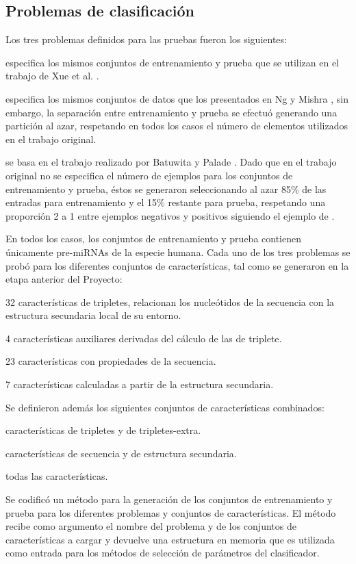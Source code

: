 \documentclass[12pt,bibliography=oldstyle,DIV=12,parskip=half-]{scrreprt}
\begin{document}
\subsection{Problemas de clasificación}
%
Los tres problemas definidos para las pruebas fueron los siguientes:
\begin{description}
  [style=sameline,leftmargin=9em,itemsep=6pt,align=right]
\item[xue]
  especifica los mismos conjuntos de entrenamiento y prueba
  que se utilizan en el trabajo de Xue et al. \cite{xue}.
\item[ng]
  especifica los mismos conjuntos de datos que los presentados en Ng y Mishra
  \cite{ng}, sin embargo, la separación entre entrenamiento y
  prueba se efectuó generando una partición al azar, respetando en
  todos los casos el número de elementos utilizados en el trabajo
  original.
\item[batuwita]
  se basa en el trabajo realizado por Batuwita y Palade
  \cite{batuwita}. Dado que en el trabajo original no se especifica el
  número de ejemplos para los conjuntos de entrenamiento y prueba,
  éstos se generaron seleccionando al azar 85\% de las entradas para
  entrenamiento y el 15\% restante para prueba, respetando una
  proporción 2 a 1 entre ejemplos negativos y positivos siguiendo
  el ejemplo de \cite{ng}.
\end{description}
En todos los casos, los conjuntos de entrenamiento y prueba contienen
únicamente pre-miRNAs de la especie humana.
Cada uno de los tres problemas se probó para los diferentes conjuntos
de características, tal como se generaron en la etapa anterior del
Proyecto:
\begin{description}
  [style=sameline,leftmargin=9em,itemsep=6pt,align=right]
\item[Triplete (T)] 32 características de tripletes, relacionan los
  nucleótidos de la secuencia con la estructura secundaria local de su
  entorno.
\item[Triplete-extra (X)] 4 características auxiliares derivadas del
  cálculo de las de triplete.
\item[Secuencia (S)] 23 características con propiedades de la
  secuencia.
\item[Estructura (E)] 7 características calculadas a partir de la
  estructura secundaria.
\end{description}
Se definieron además los siguientes conjuntos de características combinados:
\begin{description}
  [style=sameline,leftmargin=9em,itemsep=6pt,align=right]
\item[T-X] características de tripletes y de tripletes-extra.
\item[S-E] características de secuencia y de estructura secundaria.
\item[T-X-S-E] todas las características.
\end{description}
%
Se codificó un método para la generación de los conjuntos de
entrenamiento y prueba para los diferentes problemas y conjuntos de
características.  El método recibe como argumento el nombre del
problema y de los conjuntos de características a cargar y devuelve una
estructura en memoria que es utilizada como entrada para los métodos
de selección de parámetros del clasificador.
%
\end{document}
